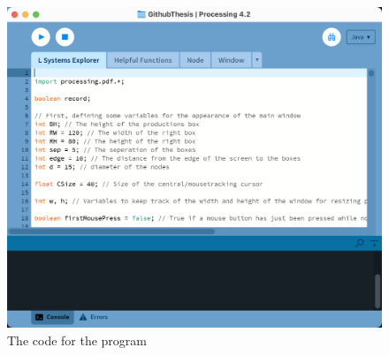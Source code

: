 \documentclass[12pt,twoside]{reedthesis}
\begin{document}
	\begin{figure}[h]
	\centering
	\includegraphics[scale=0.35]{Images/OpenProgram}
	\caption{The code for the program}
	\label {OpenProgram}
	\end{figure}
	
\end{document}
